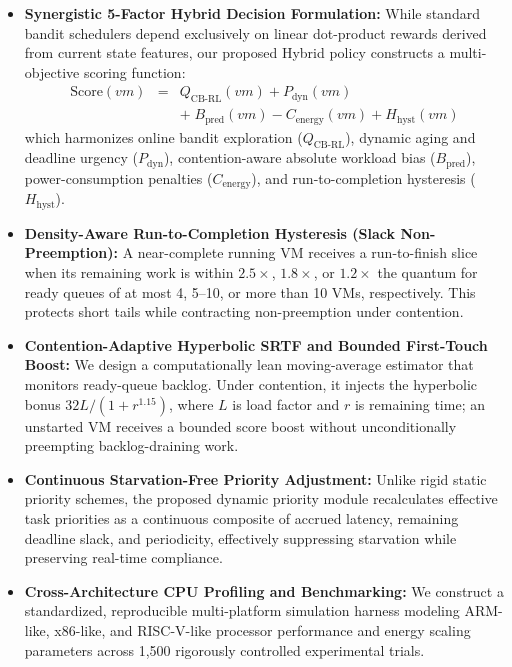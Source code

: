 \documentclass[conference]{IEEEtran}
\providecommand{\text}[1]{\mbox{#1}}
\begin{document}
\begin{itemize}
    \item \textbf{Synergistic 5-Factor Hybrid Decision Formulation:} While standard bandit schedulers depend exclusively on linear dot-product rewards derived from current state features, our proposed Hybrid policy constructs a multi-objective scoring function:
    \begin{eqnarray}
        \mathrm{Score}(vm) &=& Q_{\mathrm{CB\text{-}RL}}(vm) + P_{\mathrm{dyn}}(vm) \nonumber \\
        && +\; B_{\mathrm{pred}}(vm) - C_{\mathrm{energy}}(vm) + H_{\mathrm{hyst}}(vm)
    \end{eqnarray}
    which harmonizes online bandit exploration ($Q_{\mathrm{CB\text{-}RL}}$), dynamic aging and deadline urgency ($P_{\mathrm{dyn}}$), contention-aware absolute workload bias ($B_{\mathrm{pred}}$), power-consumption penalties ($C_{\mathrm{energy}}$), and run-to-completion hysteresis ($H_{\mathrm{hyst}}$).

    \item \textbf{Density-Aware Run-to-Completion Hysteresis (Slack Non-Preemption):} A near-complete running VM receives a run-to-finish slice when its remaining work is within $2.5\times$, $1.8\times$, or $1.2\times$ the quantum for ready queues of at most 4, 5--10, or more than 10 VMs, respectively. This protects short tails while contracting non-preemption under contention.

    \item \textbf{Contention-Adaptive Hyperbolic SRTF and Bounded First-Touch Boost:} We design a computationally lean moving-average estimator that monitors ready-queue backlog. Under contention, it injects the hyperbolic bonus $32L/(1+r^{1.15})$, where $L$ is load factor and $r$ is remaining time; an unstarted VM receives a bounded score boost without unconditionally preempting backlog-draining work.

    \item \textbf{Continuous Starvation-Free Priority Adjustment:} Unlike rigid static priority schemes, the proposed dynamic priority module recalculates effective task priorities as a continuous composite of accrued latency, remaining deadline slack, and periodicity, effectively suppressing starvation while preserving real-time compliance.

    \item \textbf{Cross-Architecture CPU Profiling and Benchmarking:} We construct a standardized, reproducible multi-platform simulation harness modeling ARM-like, x86-like, and RISC-V-like processor performance and energy scaling parameters across 1,500 rigorously controlled experimental trials.
\end{itemize}
\end{document}
